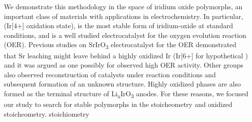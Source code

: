 We demonstrate this methodology in the space of iridium oxide polymorphs,
an important class of materials with applications in electrochemistry.
%
In particular, \rIrOtwo (Ir[4+] oxidation state), is the most stable form of iridium-oxide at standard conditions,
and is a well studied electrocatalyst for the oxygen evolution reaction (OER).
\cite{Seitz2016,Lee2012a,McCrory2015,Trotochaud2012,Danilovic2014,Carmo2013,Miles1978,Beni1979}
%
Previous studies on SrIrO\textsubscript{3} electrocatalyst for the OER demonstrated that Sr leaching might leave behind a highly oxidized Ir (Ir[6+] for hypothetical \IrOthree) and it was argued as one possibly for observed high OER activity.\cite{Seitz2016}
%
Other groups also observed reconstruction of \IrOx catalysts under reaction conditions and subsequent formation of an unknown structure. \cite{Pearce2017}
%
Highly oxidized \IrOthree phases are also formed as the terminal structure of Li\textsubscript{x}IrO\textsubscript{3} anodes.\cite{Pearce2017}
%
For these reasons, we focused our study to search for stable polymorphs in the \IrOtwo stoicheometry and  oxidized \IrOthree stoicheometry.
stoichiometry

%
%



